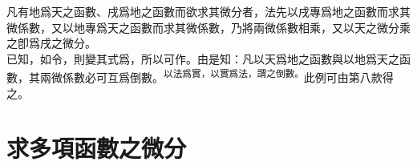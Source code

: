 \begin{enumerate} [label={第\chinese*款},nolistsep]
	凡有地爲天之函數、戌爲地之函數而欲求其微分者，法先以戌專爲地之函數而求其微係數，又以地專爲天之函數而求其微係數，乃將兩微係數相乘，又以天之微分乘之卽爲戌之微分。\\
	已知\CJKmove，如令\CJKmove，則變其式爲\CJKmove，所以可作\CJKmove。由是知：凡以天爲地之函數與以地爲天之函數，其兩微係數必可互爲倒數。\textsuperscript{以法爲實，以實爲法，謂之倒數。}此例可由第八款得之。
\end{enumerate}

\section{求多項函數之微分}

